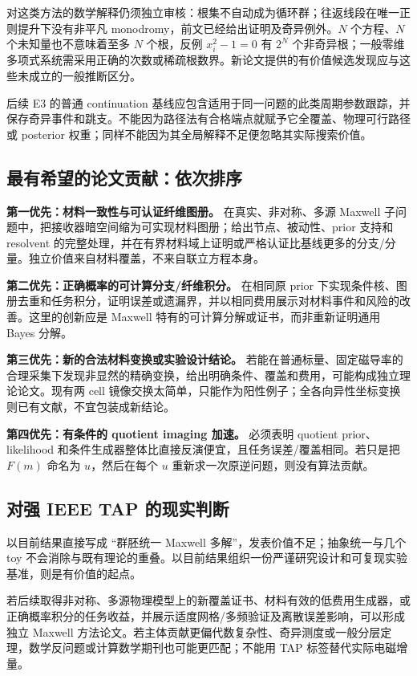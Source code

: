 对这类方法的数学解释仍须独立审核：根集不自动成为循环群；往返线段在唯一正则提升下没有非平凡 monodromy，前文已经给出证明及奇异例外。$N$ 个方程、$N$ 个未知量也不意味着至多 $N$ 个根，反例 $x_i^2-1=0$ 有 $2^N$ 个非奇异根；一般零维多项式系统需采用正确的次数或稀疏根数界。新论文提供的有价值候选发现应与这些未成立的一般推断区分。

后续 E3 的普通 continuation 基线应包含适用于同一问题的此类周期参数跟踪，并保存奇异事件和跳支。不能因为路径法有合格端点就赋予它全覆盖、物理可行路径或 posterior 权重；同样不能因为其全局解释不足便忽略其实际搜索价值。

\subsection{最有希望的论文贡献：依次排序}

\textbf{第一优先：材料一致性与可认证纤维图册。} 在真实、非对称、多源 Maxwell 子问题中，把接收器暗空间缩为可实现材料图册；给出节点、被动性、prior 支持和 resolvent 的完整处理，并在有界材料域上证明或严格认证比基线更多的分支/分量。独立价值来自材料覆盖，不来自联立方程本身。

\textbf{第二优先：正确概率的可计算分支/纤维积分。} 在相同原 prior 下实现条件核、图册去重和任务积分，证明误差或遗漏界，并以相同费用展示对材料事件和风险的改善。这里的创新应是 Maxwell 特有的可计算分解或证书，而非重新证明通用 Bayes 分解。

\textbf{第三优先：新的合法材料变换或实验设计结论。} 若能在普通标量、固定磁导率的合理采集下发现非显然的精确变换，给出明确条件、覆盖和费用，可能构成独立理论论文。现有两 cell 镜像交换太简单，只能作为阳性例子；全各向异性坐标变换则已有文献，不宜包装成新结论。

\textbf{第四优先：有条件的 quotient imaging 加速。} 必须表明 quotient prior、likelihood 和条件生成器整体比直接反演便宜，且任务误差/覆盖相同。若只是把 $F(m)$ 命名为 $u$，然后在每个 $u$ 重新求一次原逆问题，则没有算法贡献。

\subsection{对强 IEEE TAP 的现实判断}

以目前结果直接写成 ``群胚统一 Maxwell 多解''，发表价值不足；抽象统一与几个 toy 不会消除与既有理论的重叠。以目前结果组织一份严谨研究设计和可复现实验基准，则是有价值的起点。

若后续取得非对称、多源物理模型上的新覆盖证书、材料有效的低费用生成器，或正确概率积分的任务收益，并展示适度网格/多频验证及离散误差影响，可以形成独立 Maxwell 方法论文。若主体贡献更偏代数复杂性、奇异测度或一般分层定理，数学反问题或计算数学期刊也可能更匹配；不能用 TAP 标签替代实际电磁增量。

